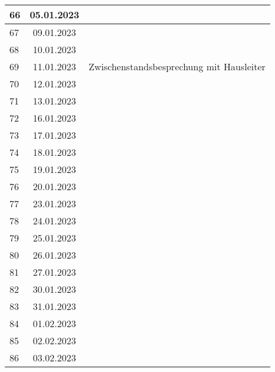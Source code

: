 \begin{longtable}{|l|c|l|}
66  & 05.01.2023    &                                                       \\ \hline 
67  & 09.01.2023    &                                                       \\ \hline 
68  & 10.01.2023    &                                                       \\ \hline 
69  & 11.01.2023    &  Zwischenstandsbesprechung mit Hausleiter                                                      \\ \hline 
70  & 12.01.2023    &                                                       \\ \hline 
71  & 13.01.2023    &                                                       \\ \hline 
72  & 16.01.2023    &                                                       \\ \hline 
73  & 17.01.2023    &                                                       \\ \hline 
74  & 18.01.2023    &                                                       \\ \hline 
75  & 19.01.2023    &                                                       \\ \hline 
76  & 20.01.2023    &                                                       \\ \hline 
77  & 23.01.2023    &                                                       \\ \hline 
78  & 24.01.2023    &                                                       \\ \hline 
79  & 25.01.2023    &                                                       \\ \hline 
80  & 26.01.2023    &                                                       \\ \hline 
81  & 27.01.2023    &                                                       \\ \hline 
82  & 30.01.2023    &                                                       \\ \hline 
83  & 31.01.2023    &                                                       \\ \hline 
84  & 01.02.2023    &                                                       \\ \hline 
85  & 02.02.2023    &                                                       \\ \hline 
86  & 03.02.2023    &                                                       \\ \hline 

\end{longtable}
